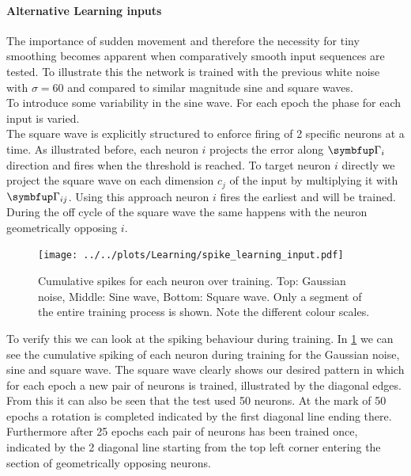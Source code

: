 \paragraph{Alternative Learning inputs}
The importance of sudden movement and therefore the necessity for tiny smoothing becomes apparent when comparatively smooth input sequences are tested. To illustrate this the network is trained with the previous white noise with $\sigma = 60$ and compared to similar magnitude sine and square waves.\\
To introduce some variability in the sine wave. For each epoch the phase for each input is varied.\\
The square wave is explicitly structured to enforce firing of 2 specific neurons at a time. As illustrated before, each neuron $i$ projects the error along $\bmu{\Gamma}_i$ direction and fires when the threshold is reached. To target neuron $i$ directly we project the square wave on each dimension $c_j$ of the input by multiplying it with $\bmu{\Gamma}_{ij}$. Using this approach neuron $i$ fires the earliest and will be trained. During the off cycle of the square wave the same happens with the neuron geometrically opposing $i$.\\
\begin{figure}
	\centering
	\texttt{[image: ../../plots/Learning/spike\_learning\_input.pdf]}
	\caption{Cumulative spikes for each neuron over training. Top: Gaussian noise, Middle: Sine wave, Bottom: Square wave. Only a segment of the entire training process is shown. Note the different colour scales.}
	\label{fig:spike_learning_input}
\end{figure}
To verify this we can look at the spiking behaviour during training. In \cref{fig:spike_learning_input} we can see the cumulative spiking of each neuron during training for the Gaussian noise, sine and square wave. The square wave clearly shows our desired pattern in which for each epoch a new pair of neurons is trained, illustrated by the diagonal edges. From this it can also be seen that the test used 50 neurons. At the mark of 50 epochs a rotation is completed indicated by the first diagonal line ending there. Furthermore after 25 epochs each pair of neurons has been trained once, indicated by the 2 diagonal line starting from the top left corner entering the section of geometrically opposing neurons.\\

